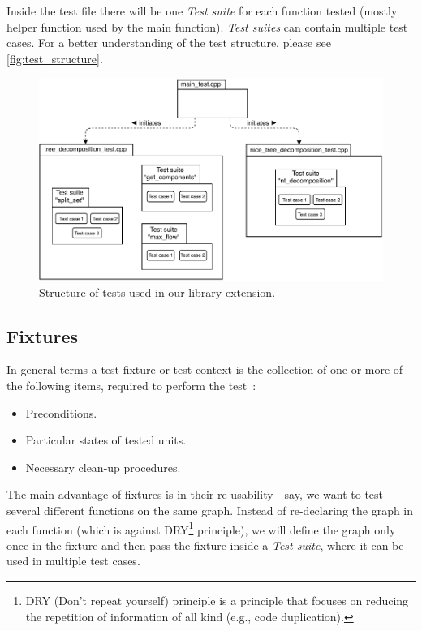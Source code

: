 \documentclass[thesis=B,english]{FITthesis}[2019/03/21]
\begin{document}
Inside the test file there will be one \emph{Test suite} for each function tested (mostly helper function used by the main function). \emph{Test suites} can contain multiple test cases. For a better understanding of the test structure, please see \autoref{fig:test_structure}.

\begin{figure}[H]
	\centering
 	\includegraphics[width=12cm]{img/test-structure.pdf}
 	\caption[Structure of tests used in our library extension]{Structure of tests used in our library extension.}
 	\label{fig:test_structure}
\end{figure}

\subsection{Fixtures}\label{ssec:fixtures}
In general terms a test fixture or test context is the collection of one or more of the following items, required to perform the test~\cite{boost_test_fixtures}:

\begin{itemize}
	\item Preconditions.
	\item Particular states of tested units.
	\item Necessary clean-up procedures.
\end{itemize}

The main advantage of fixtures is in their re-usability---say, we want to test several different functions on the same graph. Instead of re-declaring the graph in each function (which is against DRY\footnote{DRY (Don't repeat yourself) principle is a principle that focuses on reducing the repetition of information of all kind (e.g., code duplication).} principle), we will define the graph only once in the fixture and then pass the fixture inside a \emph{Test suite}, where it can be used in multiple test cases.
\end{document}
